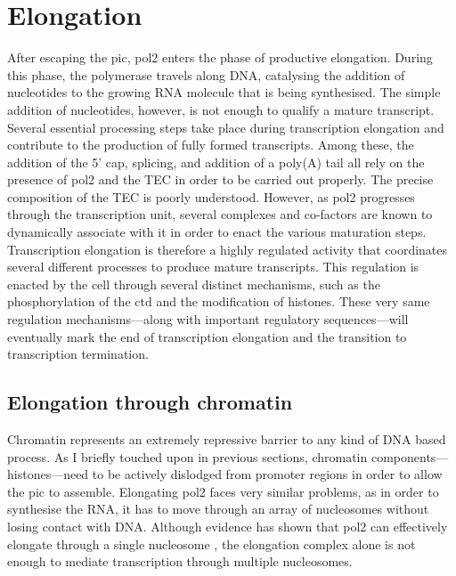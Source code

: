\section{Elongation} %
After escaping the \gls{pic}, \gls{pol2} enters the phase of productive elongation.
During this phase, the polymerase travels along DNA, catalysing the addition of nucleotides to the growing RNA molecule that is being synthesised.
The simple addition of nucleotides, however, is not enough to qualify a mature transcript.
Several essential processing steps take place during transcription elongation and contribute to the production of fully formed transcripts.
Among these, the addition of the 5' cap, splicing, and addition of a poly(A) tail all rely on the presence of \gls{pol2} and the TEC  in order to be carried out properly.
The precise composition of the TEC is poorly understood. 
However, as \gls{pol2} progresses through the transcription unit, several complexes and co-factors are known to dynamically associate with it in order to enact the various maturation steps.  
Transcription elongation is therefore a highly regulated activity that coordinates several different processes to produce mature transcripts.
This regulation is enacted by the cell through several distinct mechanisms, such as the phosphorylation of the \gls{ctd} and the modification of histones.
These very same regulation mechanisms---along with important regulatory sequences---will eventually mark the end of transcription elongation and the transition to transcription termination.

\subsection{Elongation through chromatin}
Chromatin represents an extremely repressive barrier to any kind of DNA based process.
As I briefly touched upon in previous sections, chromatin components---histones---need to be actively dislodged from promoter regions in order to allow the \acrlong{pic} to assemble.
Elongating \gls{pol2} faces very similar problems, as in order to synthesise the RNA, it has to move through an array of nucleosomes without losing contact with DNA.
Although \invitro evidence has shown that \gls{pol2} can effectively elongate through a single nucleosome , the elongation complex alone is not enough to mediate transcription through multiple nucleosomes.

